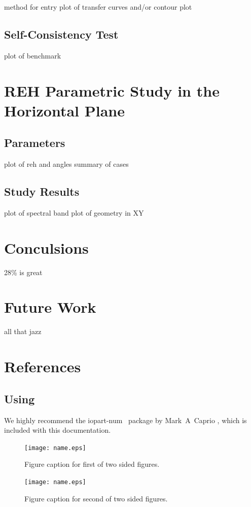 \documentclass[a4paper]{jpconf}
\begin{document}
method for entry
plot of transfer curves and/or contour plot


\subsection{Self-Consistency Test}

plot of benchmark

\section{REH Parametric Study in the Horizontal Plane}


\subsection{Parameters}

plot of reh and angles
summary of cases


\subsection{Study Results}

plot of spectral band
plot of geometry in XY


\section{Conculsions}

28\% is great



\section{Future Work}

all that jazz



\section{References}

\subsection{Using \BibTeX}
We highly recommend the {\ttfamily\textbf\selectfont iopart-num} \BibTeX\ package by Mark~A~Caprio \cite{iopartnum}, which is included with this documentation.


\begin{figure}[h]
\begin{minipage}{14pc}
\texttt{[image: name.eps]}
\caption{\label{label}Figure caption for first of two sided figures.}
\end{minipage}\hspace{2pc}%
\begin{minipage}{14pc}
\texttt{[image: name.eps]}
\caption{\label{label}Figure caption for second of two sided figures.}
\end{minipage} 
\end{figure}
\end{document}
